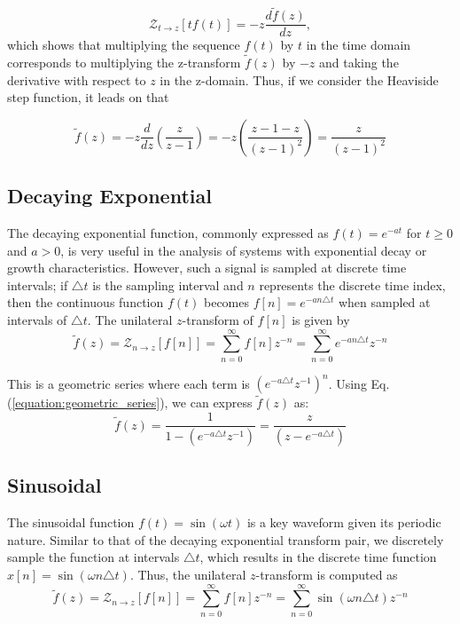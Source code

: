 \documentclass[a4paper]{report}
\begin{document}
\begin{equation}
\mathcal{Z}_{t \rightarrow z}[tf(t)] = -z \frac{d\tilde{f}(z)}{dz},
\end{equation}
which shows that multiplying the sequence $f(t)$ by $t$ in the time domain corresponds to multiplying the z-transform $\tilde{f}(z)$ by $-z$ and taking the derivative with respect to $z$ in the z-domain. Thus, if we consider the Heaviside step function, it leads on that 

\begin{equation}
\tilde{f}(z) = -z \frac{d}{dz} \left( \frac{z}{z-1} \right) = -z \left( \frac{z - 1 - z}{(z-1)^2} \right) = \frac{z}{(z-1)^2}
\end{equation}

\subsection{Decaying Exponential}\label{section:decaying_exp}
The decaying exponential function, commonly expressed as $f(t) = e^{-at}$ for $t \geq 0$ and $a > 0$, is very useful in the analysis of systems with exponential decay or growth characteristics. However, such a signal is sampled at discrete time intervals; if $\triangle t$ is the sampling interval and $n$ represents the discrete time index, then the continuous function $f(t)$ becomes $f[n] = e^{-an\triangle t}$ when sampled at intervals of $\triangle t$. The unilateral $z$-transform of $f[n]$ is given by
\begin{equation}
	\tilde{f}(z) = 	\mathcal{Z}_{n \rightarrow z}[f[n]] = \sum^{\infty}_{n = 0}f[n]z^{-n} = \sum^{\infty}_{n=0} e^{-an\triangle t}z^{-n}
\end{equation}

This is a geometric series where each term is $(e^{-a\triangle t}z^{-1})^n$. Using Eq. (\ref{equation:geometric_series}), we can express $\tilde{f}(z)$ as:
\begin{equation}
\tilde{f}(z) = \frac{1}{1 - (e^{-a\triangle t}z^{-1})}= \frac{z}{(z-e^{-a\triangle t})}
\end{equation}

\subsection{Sinusoidal}\label{section:sinusoidal}
The sinusoidal function $f(t) = \sin(\omega t)$ is a key waveform given its periodic nature. Similar to that of the decaying exponential transform pair, we discretely sample the function at intervals $\triangle t$, which results in the discrete time function $x[n] = \sin(\omega n \triangle t)$. Thus, the unilateral $z$-transform is computed as
\begin{equation}
\tilde{f}(z) = \mathcal{Z}_{n \rightarrow z}[f[n]] = \sum^{\infty}_{n = 0}f[n]z^{-n} = \sum^{\infty}_{n = 0} \sin(\omega n \triangle t)z^{-n}
\end{equation}
\end{document}
